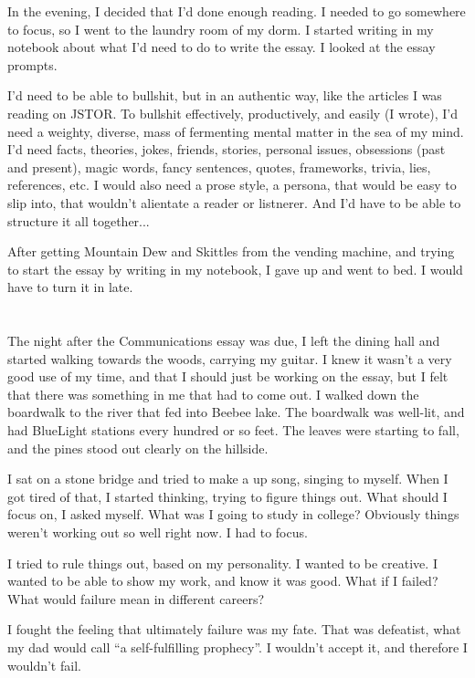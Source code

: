 In the evening, I decided that I'd done enough reading.  I needed to go
somewhere to focus, so I went to the laundry room of my dorm.  I started writing
in my notebook about what I'd need to do to write the essay.  I looked at the
essay prompts.

I'd need to be able to bullshit, but in an authentic way, like the articles I
was reading on JSTOR.  To bullshit effectively, productively, and easily  (I
wrote), I'd need a weighty, diverse, mass of fermenting mental matter in the sea
of my mind.  I'd need facts, theories, jokes, friends, stories, personal issues,
obsessions (past and present), magic words, fancy sentences, quotes, frameworks,
trivia, lies, references, etc.  I would also need a prose style, a persona, that
would be easy to slip into, that wouldn't alientate a reader or listnerer.  And
I'd have to be able to structure it all together...

After getting Mountain Dew and Skittles from the vending machine, and trying to
start the essay by writing in my notebook, I gave up and went to bed.  I would
have to turn it in late.

\section{}

The night after the Communications essay was due, I left the dining hall and
started walking towards the woods, carrying my guitar.  I knew it wasn't a very
good use of my time, and that I should just be working on the essay, but I felt
that there was something in me that had to come out.  I walked down the
boardwalk to the river that fed into Beebee lake.  The boardwalk was well-lit,
and had BlueLight stations every hundred or so feet.  The leaves were starting to
fall, and the pines stood out clearly on the hillside.

I sat on a stone bridge and tried to make a up song, singing to myself.  When I
got tired of that, I started thinking, trying to figure things out.  What should
I focus on, I asked myself.  What was I going to study in college?  Obviously
things weren't working out so well right now.  I had to focus.

I tried to rule things out, based on my personality.  I wanted to be creative.
I wanted to be able to show my work, and know it was good.  What if I failed?
What would failure mean in different careers? 

I fought the feeling that ultimately failure was my fate.  That was defeatist,
what my dad would call ``a self-fulfilling prophecy''.  I wouldn't accept it,
and therefore I wouldn't fail.  

